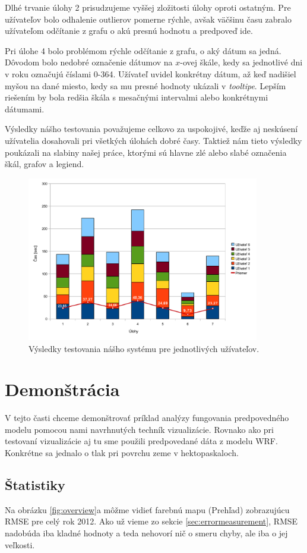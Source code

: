 Dlhé trvanie úlohy 2 prisudzujeme vyššej zložitosti úlohy oproti ostatným. Pre užívateľov bolo odhalenie outlierov pomerne rýchle, avšak väčšinu času zabralo užívateľom odčítanie z grafu o akú presnú hodnotu a predpoveď ide.

Pri úlohe 4 bolo problémom rýchle odčítanie z grafu, o aký dátum sa jedná. Dôvodom bolo nedobré označenie dátumov na \mbox{$ x $-ovej} škále, kedy sa jednotlivé dni v roku označujú číslami 0-364. Užívateľ uvidel konkrétny dátum, až keď nadišiel myšou na dané miesto, kedy sa mu presné hodnoty ukázali v \textit{tooltipe}. Lepším riešením by bola redšia škála s mesačnými intervalmi alebo konkrétnymi dátumami.

Výsledky nášho testovania považujeme celkovo za uspokojivé, keďže aj neskúsení užívatelia dosahovali pri všetkých úlohách dobré časy. Taktiež nám tieto výsledky poukázali na slabiny našej práce, ktorými sú hlavne zlé alebo slabé označenia škál, grafov a legiend.


\begin{figure}
	\centering
	\includegraphics[width = 4in]{resultchart}
	\caption{Výsledky testovania nášho systému pre jednotlivých užívateľov.}
	\label{fig:results} 
\end{figure}

\section{Demonštrácia}
V tejto časti chceme demonštrovať príklad analýzy fungovania predpovedného modelu pomocou nami navrhnutých techník vizualizácie. Rovnako ako pri testovaní vizualizácie aj tu sme použili predpovedané dáta z modelu WRF. Konkrétne sa jednalo o tlak pri povrchu zeme v hektopaskaloch.

\subsection{Štatistiky}
Na obrázku \ref{fig:overview}a môžme vidieť farebnú mapu (Prehľad) zobrazujúcu RMSE pre celý rok 2012. Ako už vieme zo sekcie \ref{sec:errormeasurement}, RMSE nadobúda iba kladné hodnoty a teda nehovorí nič o smeru chyby, ale iba o jej veľkosti. 


